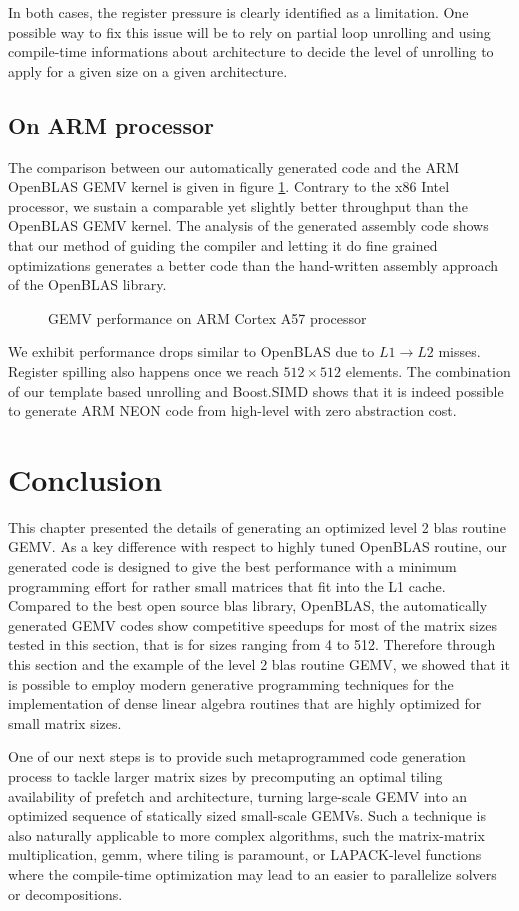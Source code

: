 \documentclass[../main]{subfiles}
\begin{document}
In both cases, the register pressure is clearly identified as a
limitation. One possible way to fix this issue will be to rely
on partial loop unrolling and using compile-time informations
about architecture to decide the level of unrolling to apply for
a given size on a given architecture.

\subsection{
  On ARM processor
}

The comparison between our automatically generated code
and the ARM OpenBLAS GEMV kernel is given in figure \ref{fig:gemv-arm-bench}.
Contrary to the x86 Intel processor, we sustain a comparable
yet slightly better throughput than the OpenBLAS GEMV
kernel. The analysis of the generated assembly code shows
that our method of guiding the compiler and letting it do
fine grained optimizations generates a better code than the
hand-written assembly approach of the OpenBLAS library.

\begin{figure}[h]
\fontsize{8}{10}\selectfont

\caption{
  GEMV performance on ARM Cortex A57 processor
}
\label{fig:gemv-arm-bench}
\end{figure}

We exhibit performance drops similar to OpenBLAS due to
$L1 \rightarrow L2$ misses. Register spilling also happens once we reach
$512 \times 512$ elements. The combination of our template based
unrolling and Boost.SIMD shows that it is indeed possible to
generate ARM NEON code from high-level \cpp with zero
abstraction cost.

\section{
  Conclusion
}

This chapter presented the details of generating an optimized
level 2 \gls{blas} routine GEMV. As a key difference with respect
to highly tuned OpenBLAS routine, our generated code
is designed to give the best performance with a minimum
programming effort for rather small matrices that fit into the
L1 cache. Compared to the best open source \gls{blas} library,
OpenBLAS, the automatically generated GEMV codes show
competitive speedups for most of the matrix sizes tested in
this section, that is for sizes ranging from 4 to 512. Therefore
through this section and the example of the level 2 \gls{blas}
routine GEMV, we showed that it is possible to employ modern
generative programming techniques for the implementation
of dense linear algebra routines that are highly optimized for
small matrix sizes.

One of our next steps is to provide such metaprogrammed
code generation process to tackle larger matrix sizes by precomputing
an optimal tiling availability of prefetch and architecture,
turning large-scale GEMV into an optimized sequence of
statically sized small-scale GEMVs. Such a technique is also naturally
applicable to more complex algorithms, such the matrix-matrix
multiplication, gemm, where tiling is paramount, or
LAPACK-level functions where the compile-time optimization
may lead to an easier to parallelize solvers or decompositions.
\end{document}
